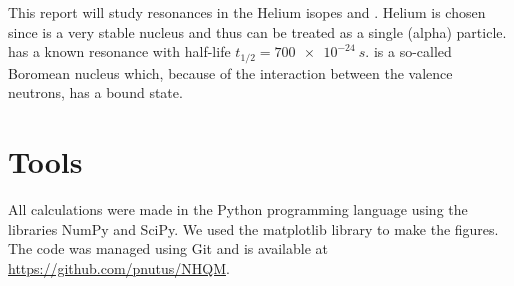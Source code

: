 This report will study resonances in the Helium isopes  and .
Helium is chosen since  is a very stable nucleus and thus can be treated as a single (alpha) particle.
 has a known resonance with half-life $t_{1/2} = \SI{700e-24}{s}$.
 is a so-called Boromean nucleus which, because of the interaction between the valence neutrons, has a bound state.




\section{Tools}

All calculations were made in the Python programming language using the libraries NumPy and SciPy. We used the matplotlib library to make the figures. The code was managed using Git and is available at \url{https://github.com/pnutus/NHQM}.